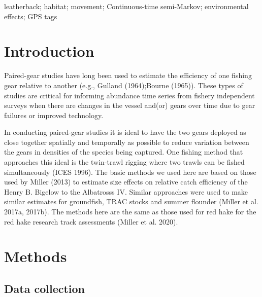\documentclass[]{article}
\begin{document}
leatherback; habitat; movement; Continuous-time semi-Markov;
environmental effects; GPS tags

\pagebreak

\hypertarget{introduction}{%
\section{Introduction}\label{introduction}}

Paired-gear studies have long been used to estimate the efficiency of
one fishing gear relative to another (e.g., Gulland (1964);Bourne
(1965)). These types of studies are critical for informing abundance
time series from fishery independent surveys when there are changes in
the vessel and(or) gears over time due to gear failures or improved
technology.

In conducting paired-gear studies it is ideal to have the two gears
deployed as close together spatially and temporally as possible to
reduce variation between the gears in densities of the species being
captured. One fishing method that approaches this ideal is the
twin-trawl rigging where two trawls can be fished simultaneously (ICES
1996). The basic methods we used here are based on those used by Miller
(2013) to estimate size effects on relative catch efficiency of the
Henry B. Bigelow to the Albatrosss IV. Similar approaches were used to
make similar estimates for groundfish, TRAC stocks and summer flounder
(Miller et al. 2017a, 2017b). The methods here are the same as those
used for red hake for the red hake research track assessments (Miller et
al. 2020).

\hypertarget{methods}{%
\section{Methods}\label{methods}}

\hypertarget{data-collection}{%
\subsection{Data collection}\label{data-collection}}
\end{document}
